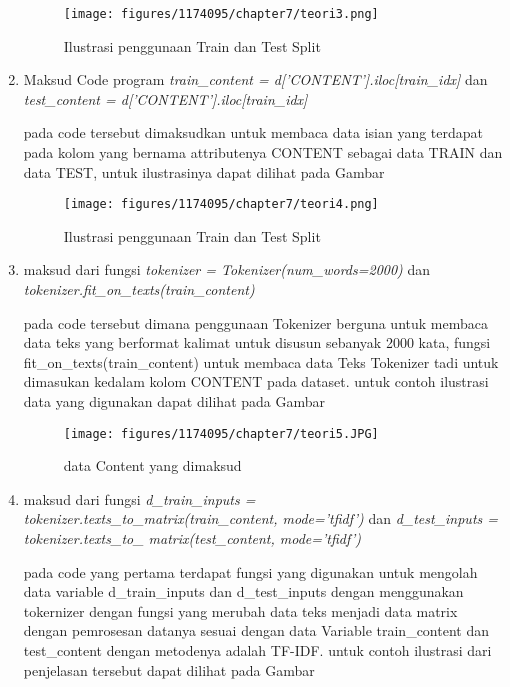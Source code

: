 \begin{enumerate}
\begin{figure}[H]
    \texttt{[image: figures/1174095/chapter7/teori3.png]}
    \centering
      \caption{Ilustrasi  penggunaan Train dan Test Split}
\end{figure}

\item Maksud Code program \emph{train\_content = d['CONTENT'].iloc[train\_idx]} dan \emph{test\_content = d['CONTENT'].iloc[train\_idx]}
\par pada code tersebut dimaksudkan untuk membaca data isian yang terdapat pada kolom yang bernama attributenya CONTENT sebagai data TRAIN dan data TEST, untuk ilustrasinya dapat dilihat pada Gambar

\begin{figure}[H]
    \texttt{[image: figures/1174095/chapter7/teori4.png]}
    \centering
      \caption{Ilustrasi  penggunaan Train dan Test Split}
\end{figure}

\item maksud dari fungsi \emph{tokenizer = Tokenizer(num\_words=2000)} dan \emph{tokenizer.fit\_on\_texts(train\_content)}
\par pada code tersebut dimana penggunaan Tokenizer berguna untuk membaca data teks yang berformat kalimat untuk disusun sebanyak 2000 kata, fungsi fit\_on\_texts(train\_content) untuk membaca data Teks Tokenizer tadi untuk dimasukan kedalam kolom CONTENT pada dataset. untuk contoh ilustrasi data yang digunakan dapat dilihat pada Gambar

\begin{figure}[H]
    \texttt{[image: figures/1174095/chapter7/teori5.JPG]}
    \centering
      \caption{data Content yang dimaksud}
\end{figure}

\item maksud dari fungsi \emph{d\_train\_inputs = tokenizer.texts\_to\_matrix(train\_content, mode='tfidf')} dan \emph{d\_test\_inputs = tokenizer.texts\_to\_ matrix(test\_content, mode='tfidf')}

\par pada code yang pertama terdapat fungsi yang digunakan untuk mengolah data variable d\_train\_inputs dan d\_test\_inputs dengan menggunakan tokernizer dengan fungsi yang merubah data teks menjadi data matrix dengan pemrosesan datanya sesuai dengan data Variable train\_content dan test\_content dengan metodenya adalah TF-IDF. untuk contoh ilustrasi dari penjelasan tersebut dapat dilihat pada Gambar


\end{enumerate}

